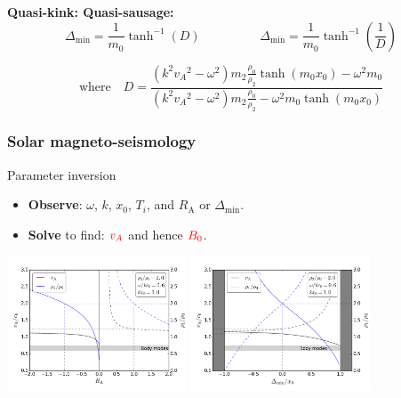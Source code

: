 \documentclass{beamer}
\begin{document}
\begin{frame}
\vspace{0.3cm}
\begin{block}{\textbf{Quasi-kink: \hspace{3.5cm} Quasi-sausage:}}
\vspace{-0.3cm}
\begin{equation*}
\Delta_\mathrm{min} = \frac{1}{m_0}\tanh^{-1}(D)
\hspace{2cm}
\Delta_\mathrm{min} = \frac{1}{m_0}\tanh^{-1}\left( \frac{1}{D} \right)
\end{equation*}
\end{block}

\begin{equation*}
\text{where} \quad
D = \frac{(k^2{v_A}^2-\omega^2)m_2\frac{\rho_0}{\rho_2}\tanh({m_0}x_0) - \omega^2{m_0}}{(k^2{v_A}^2-\omega^2)m_2\frac{\rho_0}{\rho_2} - \omega^2{m_0}\tanh({m_0}x_0)}
\end{equation*}
\end{frame}




\begin{frame}
\frametitle{Solar magneto-seismology}
\begin{block}{Parameter inversion}
\begin{itemize}
\item \textbf{Observe}: $\omega$, $k$, $x_0$, $T_i$, and $R_\mathrm{A}$ or $\Delta_\mathrm{min}$.
\item \textbf{Solve} to find: $\textcolor{red}{v_A}$ and hence $\textcolor{red}{B_0}$.
\end{itemize}
\end{block}
\vspace*{0.1in}
\centering
\includegraphics[height=4cm]{media/RA_vA_approx_2var.png}
\includegraphics[height=4cm]{media/DM_vA_approx_2var.png}
\end{frame}
\end{document}
